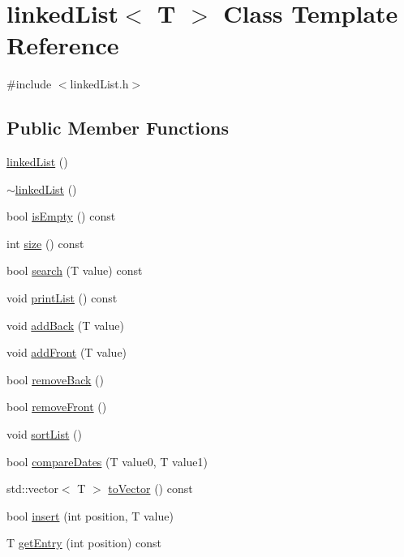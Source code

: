 \hypertarget{classlinkedList}{}\section{linked\+List$<$ T $>$ Class Template Reference}
\label{classlinkedList}


{\ttfamily \#include $<$linked\+List.\+h$>$}

\subsection*{Public Member Functions}
\begin{DoxyCompactItemize}
\item 
\hyperlink{classlinkedList_a63f463149258669636253a7977157c9c}{linked\+List} ()
\item 
\hyperlink{classlinkedList_ab1a1db35879ca07c40b68ccb2b05d150}{$\sim$linked\+List} ()
\item 
bool \hyperlink{classlinkedList_ad0e0ad616b6a66e47b8b0700cea4f1c4}{is\+Empty} () const 
\item 
int \hyperlink{classlinkedList_aad1ccecbf9f1b5a5a3c41844075ed768}{size} () const 
\item 
bool \hyperlink{classlinkedList_a4fea326f144dd457c7c7e351475cef47}{search} (T value) const 
\item 
void \hyperlink{classlinkedList_aae3a4fc3ad65a6faab8313f90a66e5ae}{print\+List} () const 
\item 
void \hyperlink{classlinkedList_a228718a0b785bd1f8b987962774f177f}{add\+Back} (T value)
\item 
void \hyperlink{classlinkedList_af96d3e766bbd2f1c62edc49fb1c66fc6}{add\+Front} (T value)
\item 
bool \hyperlink{classlinkedList_a4c07d7c746d1aa4edc9d75b1e45987e9}{remove\+Back} ()
\item 
bool \hyperlink{classlinkedList_a950409c8ae9d09a1d930f5d9f1b84a23}{remove\+Front} ()
\item 
void \hyperlink{classlinkedList_addb0fd9389aa4a6e814c230b49713110}{sort\+List} ()
\item 
bool \hyperlink{classlinkedList_a011f58721a9d41f5cac88ed761855871}{compare\+Dates} (T value0, T value1)
\item 
std\+::vector$<$ T $>$ \hyperlink{classlinkedList_a0f0ba5040a912e1ab0fe50771100997a}{to\+Vector} () const 
\item 
bool \hyperlink{classlinkedList_aa18ea45a38e5593b8adc1e79029b3977}{insert} (int position, T value)
\item 
T \hyperlink{classlinkedList_aa363a374efc5e276b2680e3763c4d9fa}{get\+Entry} (int position) const 
\end{DoxyCompactItemize}


